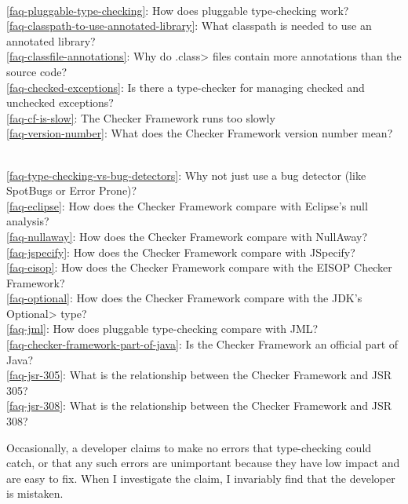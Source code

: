 \\ \ref{faq-pluggable-type-checking}: How does pluggable type-checking work?
\\ \ref{faq-classpath-to-use-annotated-library}: What classpath is needed to use an annotated library?
\\ \ref{faq-classfile-annotations}: Why do \<.class> files contain more annotations than the source code?
\\ \ref{faq-checked-exceptions}: Is there a type-checker for managing checked and unchecked exceptions?
\\ \ref{faq-cf-is-slow}: The Checker Framework runs too slowly
\\ \ref{faq-version-number}: What does the Checker Framework version number mean?

\\ \ref{faq-type-checking-vs-bug-detectors}: Why not just use a bug detector (like SpotBugs or Error Prone)?
\\ \ref{faq-eclipse}: How does the Checker Framework compare with Eclipse's null analysis?
\\ \ref{faq-nullaway}: How does the Checker Framework compare with NullAway?
\\ \ref{faq-jspecify}: How does the Checker Framework compare with JSpecify?
\\ \ref{faq-eisop}: How does the Checker Framework compare with the EISOP Checker Framework?
\\ \ref{faq-optional}: How does the Checker Framework compare with the JDK's \<Optional> type?
\\ \ref{faq-jml}: How does pluggable type-checking compare with JML?
\\ \ref{faq-checker-framework-part-of-java}: Is the Checker Framework an official part of Java?
\\ \ref{faq-jsr-305}: What is the relationship between the Checker Framework and JSR 305?
\\ \ref{faq-jsr-308}: What is the relationship between the Checker Framework and JSR 308?




Occasionally, a developer claims to make no errors that type-checking
could catch, or that any such errors are unimportant because they have low
impact and are easy to fix.  When I investigate the claim, I invariably
find that the developer is mistaken.

